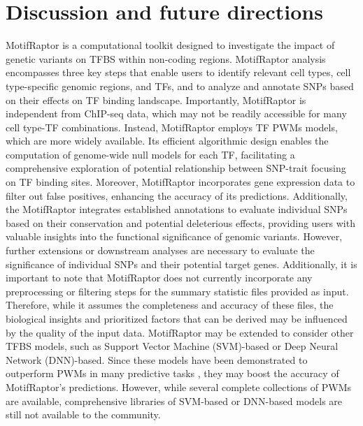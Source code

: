 \documentclass[a4paper, titlepage, openright]{book}
\newcommand{\motifraptor}{MotifRaptor\xspace}
\begin{document}
\section{Discussion and future directions}
\motifraptor is a computational toolkit designed to investigate the impact of genetic variants on TFBS within non-coding regions. \motifraptor analysis encompasses three key steps that enable users to identify relevant cell types, cell type-specific genomic regions, and TFs, and to analyze and annotate SNPs based on their effects on TF binding landscape. Importantly, \motifraptor is independent from ChIP-seq data, which may not be readily accessible for many cell type-TF combinations. Instead, \motifraptor employs TF PWMs models, which are more widely available. Its efficient algorithmic design enables the computation of genome-wide null models for each TF, facilitating a comprehensive exploration of potential relationship between SNP-trait focusing on TF binding sites. Moreover, \motifraptor  incorporates gene expression data to filter out false positives, enhancing the accuracy of its predictions. Additionally, the \motifraptor integrates established annotations to evaluate individual SNPs based on their conservation and potential deleterious effects, providing users with valuable insights into the functional significance of genomic variants. However, further extensions or downstream analyses are necessary to evaluate the significance of individual SNPs and their potential target genes. Additionally, it is important to note that \motifraptor does not currently incorporate any preprocessing or filtering steps for the summary statistic files provided as input. Therefore, while it assumes the completeness and accuracy of these files, the biological insights and prioritized factors that can be derived may be influenced by the quality of the input data. \motifraptor may be extended to consider other TFBS models, such as Support Vector Machine (SVM)-based or Deep Neural Network (DNN)-based. Since these models have been demonstrated to outperform PWMs in many predictive tasks \citep{tognon2023survey}, they may boost the accuracy of \motifraptor's predictions. However, while several complete collections of PWMs are available, comprehensive libraries of SVM-based or DNN-based models are still not available to the community.
\end{document}
